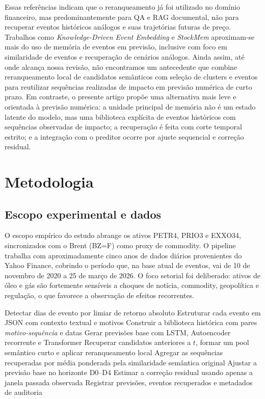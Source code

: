 \documentclass[conference]{IEEEtran}
\begin{document}
Essas referências indicam que o reranqueamento já foi utilizado no domínio financeiro, mas predominantemente para QA e RAG documental, não para recuperar eventos históricos análogos e suas trajetórias futuras de preço. Trabalhos como \textit{Knowledge-Driven Event Embedding} \cite{Ding:2016} e \textit{StockMem} \cite{Wang:2025StockMem} aproximam-se mais do uso de memória de eventos em previsão, inclusive com foco em similaridade de eventos e recuperação de cenários análogos. Ainda assim, até onde alcança nossa revisão, não encontramos um antecedente que combine reranqueamento local de candidatos semânticos com seleção de clusters e eventos para reutilizar sequências realizadas de impacto em previsão numérica de curto prazo. Em contraste, o presente artigo propõe uma alternativa mais leve e orientada à previsão numérica: a unidade principal de memória não é um estado latente do modelo, mas uma biblioteca explícita de eventos históricos com sequências observadas de impacto; a recuperação é feita com corte temporal estrito; e a integração com o preditor ocorre por ajuste sequencial e correção residual.

\section{Metodologia}

\subsection{Escopo experimental e dados}

O escopo empírico do estudo abrange os ativos PETR4, PRIO3 e EXXO34, sincronizados com o Brent (BZ=F) como proxy de commodity. O pipeline trabalha com aproximadamente cinco anos de dados diários provenientes do Yahoo Finance, cobrindo o período que, na base atual de eventos, vai de 10 de novembro de 2020 a 25 de março de 2026. O foco setorial foi deliberado: ativos de óleo e gás são fortemente sensíveis a choques de notícia, commodity, geopolítica e regulação, o que favorece a observação de efeitos recorrentes.

\begin{algorithm}[t]
\caption{Resumo do pipeline híbrido proposto}
\label{alg:pipeline}
\small
\begin{algorithmic}[1]
\State Detectar dias de evento por limiar de retorno absoluto
\State Estruturar cada evento em JSON com contexto textual e motivos
\State Construir a biblioteca histórica com pares \textit{motivo-sequência} e datas
\State Gerar previsões base com LSTM, Autoencoder recorrente e Transformer
    \State Recuperar candidatos anteriores a $t$, formar um pool semântico curto e aplicar reranqueamento local
    \State Agregar as sequências recuperadas por média ponderada pela similaridade semântica original
    \State Ajustar a previsão base no horizonte D0--D4
    \State Estimar a correção residual usando apenas a janela passada observada
\EndFor
\State Registrar previsões, eventos recuperados e metadados de auditoria
\end{algorithmic}
\end{algorithm}
\end{document}

